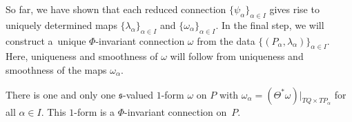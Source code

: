 So far, we have shown that each reduced connection $\{\psi_\alpha\}_{\alpha \in I}$ gives rise to uniquely
determined maps $\{\lambda_\alpha\}_{\alpha \in I}$ and $\{\omega_\alpha\}_{\alpha \in I}$.
In the f\/inal step, we will construct a~unique $\Phi$-invariant connection $\omega$ from the data
$\{(P_\alpha,\lambda_\alpha)\}_{\alpha\in I}$.
Here, uniqueness and smoothness of $\omega$ will follow from uniqueness and smoothness of the maps $\omega_\alpha$.

\begin{Proposition}\label{prop:reconstr}
There is one and only one $\mathfrak{s}$-valued $1$-form $\omega$ on $P$ with
$\omega_\alpha=(\Theta^{*}\omega)|_{TQ\times TP_\alpha}$ for all $\alpha \in I$. This $1$-form is a $\Phi$-invariant connection on~$P$.
\end{Proposition}

